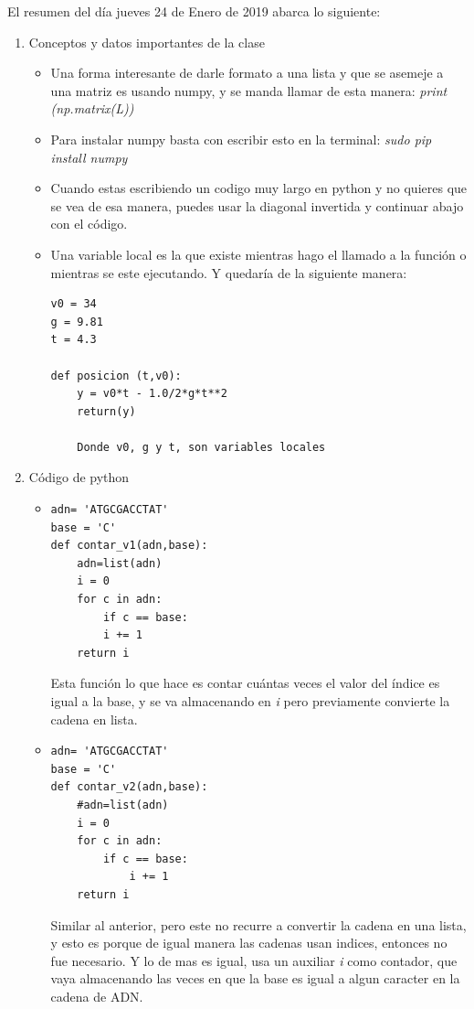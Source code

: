 \label{key}\documentclass[letterpaper, 12pt,oneside]{article}
\begin{document}
	El resumen del día jueves 24 de Enero de 2019 abarca lo siguiente:
	\begin{enumerate}
		\item Conceptos y datos importantes de la clase
			\begin{itemize}
				\item Una forma interesante de darle formato a una lista y que se asemeje a una matriz es usando numpy, y se manda llamar de esta manera: \textit{print (np.matrix(L))}\\
				

				\item Para instalar numpy basta con escribir esto en la terminal: \textit{sudo pip install numpy}\\
				
				\item Cuando estas escribiendo un codigo muy largo en python y no quieres que se vea de esa manera, puedes usar la diagonal invertida y continuar abajo con el código.\\
				
				\item Una variable local es la que existe mientras hago el llamado a la función o mientras se este ejecutando. Y quedaría de la siguiente manera:  \begin{lstlisting}
v0 = 34
g = 9.81
t = 4.3

def posicion (t,v0):
    y = v0*t - 1.0/2*g*t**2
    return(y)

    Donde v0, g y t, son variables locales			
				\end{lstlisting}
				
				
				
			\end{itemize}
		
		
		
		\item Código de python
			\begin{itemize}
				\item \begin{lstlisting}
adn= 'ATGCGACCTAT'
base = 'C'				
def contar_v1(adn,base):
    adn=list(adn)
    i = 0
    for c in adn:
        if c == base:
        i += 1
    return i
				\end{lstlisting} Esta función lo que hace es contar cuántas veces el valor del índice es igual a la base, y se va almacenando en \textit{i} pero previamente convierte la cadena en lista.\\
				
				
				\item \begin{lstlisting}
adn= 'ATGCGACCTAT'
base = 'C'
def contar_v2(adn,base):
    #adn=list(adn)
    i = 0
    for c in adn:
        if c == base:
            i += 1
    return i
				\end{lstlisting} Similar al anterior, pero este no recurre a convertir la cadena en una lista, y esto es porque de igual manera las cadenas usan indices, entonces no fue necesario. Y lo de mas es igual, usa un auxiliar \textit{i} como contador, que vaya almacenando las veces en que la base es igual a algun caracter en la cadena de ADN.\\
				

\end{itemize}
\end{enumerate}
\end{document}
